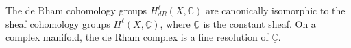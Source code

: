 The de Rham cohomology groups $H_{dR}^\ell(X, \mathbb{C})$ are canonically isomorphic to the sheaf cohomology groups $H^\ell(X, \underline{\mathbb{C}})$, where $\underline{\mathbb{C}}$ is the constant sheaf. On a complex manifold, the de Rham complex is a fine resolution of $\underline{\mathbb{C}}$.
